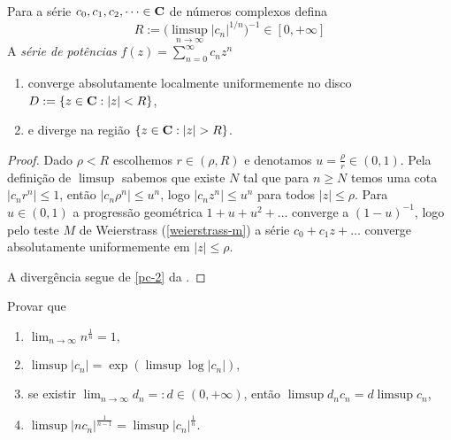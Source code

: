 \begin{lema}
\label{cauchy-hadamard}
Para a série $c_0,c_1,c_2,\dots \in \mathbf{C}$ de números complexos defina
\begin{equation}
\label{eq:hadamard}
R := \big(\limsup_{n\to\infty} |c_n|^{1/n}\big)^{-1} \in [0,+\infty]
\end{equation}
A \emph{série de potências} $f(z) = \sum_{n=0}^\infty c_n z^n$
\begin{enumerate}
\item converge absolutamente localmente uniformemente no disco $D := \{z\in\mathbf{C}: |z|<R \}$,
\item e diverge na região $\{ z\in\mathbf{C}: |z| > R \}$.
\end{enumerate}
\end{lema}
\begin{proof}
Dado $\rho < R$ escolhemos $r \in (\rho,R)$ e denotamos $u=\frac{\rho}{r} \in (0,1)$.
Pela definição de $\limsup$ sabemos que existe $N$
tal que para $n\geq N$ temos uma cota $|c_n r^n| \leq 1$,
então $|c_n \rho^n| \leq u^n$, logo $|c_n z^n| \leq u^n$ para todos $|z|\leq\rho$.
Para $u\in(0,1)$ a progressão geométrica $1+u+u^2 + \dots$ converge a $(1-u)^{-1}$,
logo pelo teste $M$ de Weierstrass (\cref{weierstrass-m})
a série $c_0 + c_1 z + \dots$ converge absolutamente uniformemente em $|z|\leq\rho$.

A divergência segue de \cref{pc-2} da .
\end{proof}

\begin{problema}
\label{raio-derivada}
Provar que
\begin{enumerate}
\item $\lim_{n\to\infty} n^{\frac1n} = 1,$
\item $\limsup |c_n| = \exp(\limsup \log|c_n|),$
\item  se existir $\lim_{n\to \infty} d_n =: d \in(0,+\infty)$, então $\limsup d_n c_n = d \limsup c_n$,
\item \label{rd-4} $\limsup |n c_n|^{\frac1{n-1}} = \limsup |c_n|^{\frac{1}n}$.
\end{enumerate}
\end{problema}


